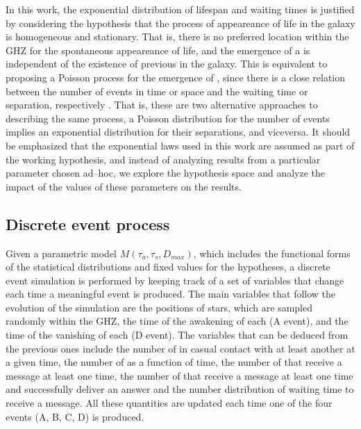 In this work, the exponential distribution of lifespan and waiting
times is justified by considering the hypothesis that the process of
appeareance of life in the galaxy is homogeneous and stationary.
%
That is, there is no preferred location within the GHZ for the
spontaneous appeareance of life, and the emergence of a \ceti{} is
independent of the existence of previous \cetis{} in the galaxy.
%            
This is equivalent to proposing a Poisson process for the emergence of
\cetis{}, since there is a close relation between the number of events
in time or space and the waiting time or separation, respectively
\citep[e.g., ][]{ross_simulation_2012}.
%
That is, these are two alternative approaches to describing the same
process, a Poisson distribution for the number of events implies an
exponential distribution for their separations, and viceversa.
%
It should be emphasized that the exponential laws used in this work
are assumed as part of the working hypothesis, and instead of
analyzing results from a particular parameter chosen ad--hoc, we
explore the hypothesis space and analyze the impact of the values of
these parameters on the results.
                                                           



\subsection{Discrete event process}

Given a parametric model $M(\tau_a, \tau_s, D_{max})$, which includes
the functional forms of the statistical distributions and fixed values
for the hypotheses, a discrete event simulation is performed by
keeping track of a set of variables that change each time a meaningful
event is produced.
%
The main variables that follow the evolution of the simulation are the
positions of stars, which are sampled randomly within the GHZ, the
time of the awakening of each \ceti{} (A event), and the time of the
vanishing of each \ceti{} (D event).
%
The variables that can be deduced from the previous ones include the
number of \cetis{} in casual contact with at least another \ceti{} at a given
time, the number of \cetis{} as a function of time, the number of
\cetis{}
that receive a message at least one time, the number of \cetis{} that
receive a message at least one time and successfully deliver an answer
and the number distribution of waiting time to receive a message.
%
All these quantities are updated each time one of the four events (A,
B, C, D) is produced.
          
